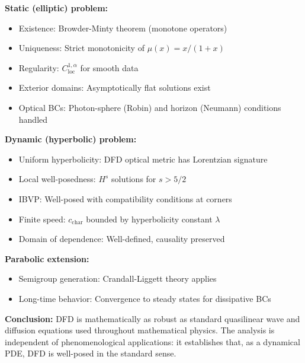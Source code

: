\begin{tcolorbox}[colback=green!5!white, colframe=green!60!black, title=Mathematical Well-Posedness Summary]
\textbf{Static (elliptic) problem:}
\begin{itemize}[nosep]
\item Existence: Browder-Minty theorem (monotone operators)
\item Uniqueness: Strict monotonicity of $\mu(x) = x/(1+x)$
\item Regularity: $C^{1,\alpha}_{\mathrm{loc}}$ for smooth data
\item Exterior domains: Asymptotically flat solutions exist
\item Optical BCs: Photon-sphere (Robin) and horizon (Neumann) conditions handled
\end{itemize}

\textbf{Dynamic (hyperbolic) problem:}
\begin{itemize}[nosep]
\item Uniform hyperbolicity: DFD optical metric has Lorentzian signature
\item Local well-posedness: $H^s$ solutions for $s > 5/2$
\item IBVP: Well-posed with compatibility conditions at corners
\item Finite speed: $c_{\mathrm{char}}$ bounded by hyperbolicity constant $\lambda$
\item Domain of dependence: Well-defined, causality preserved
\end{itemize}

\textbf{Parabolic extension:}
\begin{itemize}[nosep]
\item Semigroup generation: Crandall-Liggett theory applies
\item Long-time behavior: Convergence to steady states for dissipative BCs
\end{itemize}

\textbf{Conclusion:} DFD is mathematically as robust as standard quasilinear 
wave and diffusion equations used throughout mathematical physics. The 
analysis is independent of phenomenological applications: it establishes 
that, as a dynamical PDE, DFD is well-posed in the standard sense.
\end{tcolorbox}
